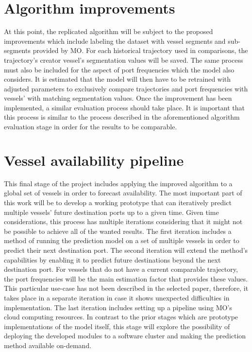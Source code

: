 \section{Algorithm improvements}

At this point, the replicated algorithm will be subject to the proposed improvements which include labeling the dataset with vessel segments and sub-segments provided by MO. For each historical trajectory used in comparisons, the trajectory’s creator vessel’s segmentation values will be saved. The same process must also be included for the aspect of port frequencies which the model also considers. It is estimated that the model will then have to be retrained with adjusted parameters to exclusively compare trajectories and port frequencies with vessels’ with matching segmentation values. Once the improvement has been implemented, a similar evaluation process should take place. It is important that this process is similar to the process described in the aforementioned algorithm evaluation stage in order for the results to be comparable.

\section{Vessel availability pipeline}

This final stage of the project includes applying the improved algorithm to a global set of vessels in order to forecast availability. The most important part of this work will be to develop a working prototype that can iteratively predict multiple vessels’ future destination ports up to a given time. Given time considerations, this process has multiple iterations considering that it might not be possible to achieve all of the wanted results. The first iteration includes a method of running the prediction model on a set of multiple vessels in order to predict their next destination port. The second iteration will extend the method’s capabilities by enabling it to predict future destinations beyond the next destination port. For vessels that do not have a current comparable trajectory, the port frequencies will be the main estimation factor that provides these values. This particular use-case has not been described in the selected paper, therefore, it takes place in a separate iteration in case it shows unexpected difficulties in implementation. The last iteration includes setting up a pipeline using MO’s cloud computing resources. In contrast to the prior stages which are prototype implementations of the model itself, this stage will explore the possibility of deploying the developed modules to a software cluster and making the prediction method available on-demand.
